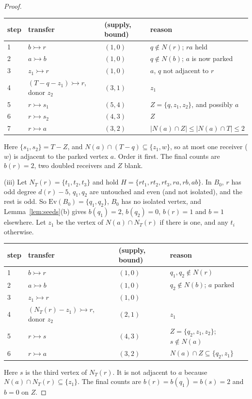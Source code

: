 \documentclass[11pt]{amsart}
\theoremstyle{definition}
\newcommand{\Ev}{\mathrm{Ev}}
\newcommand{\tr}{\rightarrowtail}   %
\begin{document}
\begin{proof}
\begin{center}\small
\begin{tabular}{llll}
\toprule
step & transfer & (supply, bound) & reason\\
\midrule
1 & $b\tr r$ & $(1,0)$ & $q\notin N(r)$; $ra$ held\\
2 & $a\tr b$ & $(1,0)$ & $q\notin N(b)$; $a$ is now parked\\
3 & $z_1\tr r$ & $(1,0)$ & $a$, $q$ not adjacent to $r$\\
4 & $(T-q-z_1)\tr r$, donor $z_2$ & $(3,1)$ & $z_1$\\
5 & $r\tr s_1$ & $(5,4)$ & $Z=\{q,z_1,z_2\}$, and possibly $a$\\
6 & $r\tr s_2$ & $(4,3)$ & $Z$\\
7 & $r\tr a$ & $(3,2)$ & $|N(a)\cap Z|\le|N(a)\cap T|\le2$\\
\bottomrule
\end{tabular}
\end{center}

Here $\{s_1,s_2\}=T-Z$, and $N(a)\cap(T-q)\subseteq\{z_1,w\}$, so at most one receiver ($w$) is
adjacent to the parked vertex $a$. Order it first. The final counts are $b(r)=2$, two doubled
receivers and $Z$ blank.

(iii) Let $N_T(r)=\{t_1,t_2,t_3\}$ and hold $H=\{rt_1,rt_2,rt_3,ra,rb,ab\}$. In $B_0$, $r$ has odd
degree $d(r)-5$, $q_1,q_2$ are untouched and even (and not isolated), and the rest is odd. So
$\Ev(B_0)=\{q_1,q_2\}$, $B_0$ has no isolated vertex, and Lemma~\ref{lem:seeds}(b) gives $b(q_1)=2$, $b(q_2)=0$, $b(r)=1$ and $b=1$ elsewhere. Let $z_1$
be the vertex of $N(a)\cap N_T(r)$ if there is one, and any $t_i$ otherwise.

\begin{center}\small
\begin{tabular}{llll}
\toprule
step & transfer & (supply, bound) & reason\\
\midrule
1 & $b\tr r$ & $(1,0)$ & $q_1,q_2\notin N(r)$\\
2 & $a\tr b$ & $(1,0)$ & $q_2\notin N(b)$; $a$ parked\\
3 & $z_1\tr r$ & $(1,0)$ & \\
4 & $(N_T(r)-z_1)\tr r$, donor $z_2$ & $(2,1)$ & $z_1$\\
5 & $r\tr s$ & $(4,3)$ & $Z=\{q_2,z_1,z_2\}$; $s\notin N(a)$\\
6 & $r\tr a$ & $(3,2)$ & $N(a)\cap Z\subseteq\{q_2,z_1\}$\\
\bottomrule
\end{tabular}
\end{center}

Here $s$ is the third vertex of $N_T(r)$. It is not adjacent to $a$ because
$N(a)\cap N_T(r)\subseteq\{z_1\}$. The final counts are $b(r)=b(q_1)=b(s)=2$ and $b=0$ on $Z$.
\end{proof}
\end{document}
